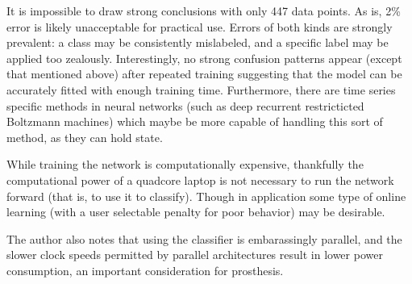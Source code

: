 \documentclass[10pt, conference, compsocconf]{IEEEtran}
\begin{document}
It is impossible to draw strong conclusions with only 447 data points. As is, 2\% error is likely unacceptable for practical use. Errors of both kinds are strongly prevalent: a class may be consistently mislabeled, and a specific label may be applied too zealously. Interestingly, no strong confusion patterns appear (except that mentioned above) after repeated training suggesting that the model can be accurately fitted with enough training time. Furthermore, there are time series specific methods in neural networks (such as deep recurrent restricticted Boltzmann machines) which maybe be more capable of handling this sort of method, as they can hold state.

While training the network is computationally expensive, thankfully the computational power of a quadcore laptop is not necessary to run the network forward (that is, to use it to classify). Though in application some type of online learning (with a user selectable penalty for poor behavior) may be desirable.

The author also notes that using the classifier is embarassingly parallel, and the slower clock speeds permitted by parallel architectures result in lower power consumption, an important consideration for prosthesis.
\end{document}
